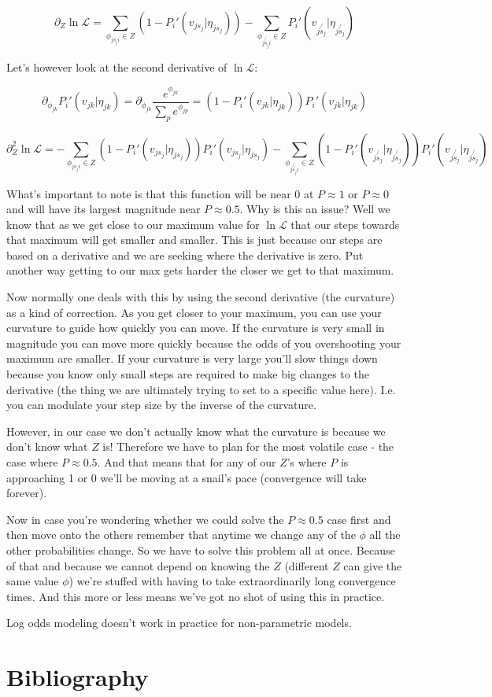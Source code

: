 \documentclass[11pt]{article}
\begin{document}
$$\partial_Z \ln{\mathcal{L}}=\sum_{\phi_{js_ji} \in Z}\left(1-P_i'(v_{js_j} | \eta_{js_j}) \right)-\sum_{\phi_{j\not{s_j}i}\in Z}P_i'(v_{j\not{s_j}} | \eta_{j\not{s_j}})$$

Let's however look at the second derivative of $\ln{\mathcal{L}}$:

$$\partial_{\phi_{jk}} P_i'(v_{jk} | \eta_{jk})=\partial_{\phi_{jk}} \frac{e^{\phi_{jk}}}{\sum_p e^{\phi_{jp}}}=(1-P_i'(v_{jk} | \eta_{jk}))P_i'(v_{jk} | \eta_{jk})$$


$$\partial^2_Z \ln{\mathcal{L}}=-\sum_{\phi_{js_ji} \in Z}\left(1-P_i'(v_{js_j} | \eta_{js_j}) \right)P_i'(v_{js_j} | \eta_{js_j})-\sum_{\phi_{j\not{s_j}i}\in Z}\left(1-P_i'(v_{j\not{s_j}} | \eta_{j\not{s_j}}) \right)P_i'(v_{j\not{s_j}} | \eta_{j\not{s_j}})$$

What's important to note is that this function will be near 0 at $P\approx 1$ or $P\approx 0$ and will have its largest magnitude near $P \approx 0.5$. Why is this an issue? Well we know that as we get close to our maximum value for $\ln{\mathcal{L}}$ that our steps towards that maximum will get smaller and smaller. This is just because our steps are based on a derivative and we are seeking where the derivative is zero. Put another way getting to our max gets harder the closer we get to that maximum. 

Now normally one deals with this by using the second derivative (the curvature) as a kind of correction. As you get closer to your maximum, you can use your curvature to guide how quickly you can move. If the curvature is very small in magnitude you can move more quickly because the odds of you overshooting your maximum are smaller. If your curvature is very large you'll slow things down because you know only small steps are required to make big changes to the derivative (the thing we are ultimately trying to set to a specific value here). I.e. you can modulate your step size by the inverse of the curvature. 

However, in our case we don't actually know what the curvature is because we don't know what $Z$ is! Therefore we have to plan for the most volatile case - the case where $P\approx 0.5$. And that means that for any of our $Z$'s where $P$ is approaching 1 or 0 we'll be moving at a snail's pace (convergence will take forever). 

Now in case you're wondering whether we could solve the $P\approx 0.5$ case first and then move onto the others remember that anytime we change any of the $\phi$ all the other probabilities change. So we have to solve this problem all at once. Because of that and because we cannot depend on knowing the $Z$ (different $Z$ can give the same value $\phi$) we're stuffed with having to take extraordinarily long convergence times. And this more or less means we've got no shot of using this in practice. \newline

Log odds modeling doesn't work in practice for non-parametric models. 


\newpage

\section{Bibliography}



\end{document}
